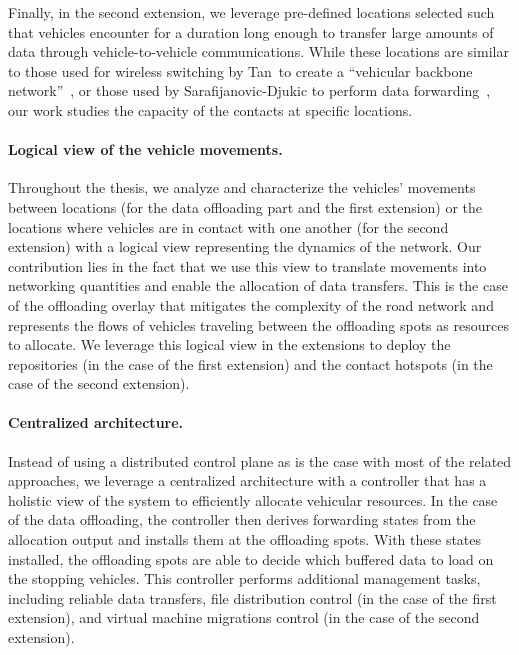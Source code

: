 Finally, in the second extension, we leverage pre-defined locations selected such that vehicles encounter for a duration long enough to transfer large amounts of data through vehicle-to-vehicle communications. While these locations are similar to those used for wireless switching by Tan~\etal to create a ``vehicular backbone network''~\cite{tan2014vehicular}, or those used by Sarafijanovic-Djukic \etal to perform data forwarding~\cite{sarafijanovic2006island}, our work studies the capacity of the contacts at specific locations.

\paragraph{Logical view of the vehicle movements.}
Throughout the thesis, we analyze and characterize the vehicles' movements between locations (for the data offloading part and the first extension) or the locations where vehicles are in contact with one another (for the second extension) with a logical view representing the dynamics of the network. Our contribution lies in the fact that we use this view to translate movements into networking quantities and enable the allocation of data transfers. This is the case of the offloading overlay that mitigates the complexity of the road network and represents the flows of vehicles traveling between the offloading spots as resources to allocate. We leverage this logical view in the extensions to deploy the repositories (in the case of the first extension) and the contact hotspots (in the case of the second extension).

\paragraph{Centralized architecture.}
Instead of using a distributed control plane as is the case with most of the related approaches, we leverage a centralized architecture with a controller that has a holistic view of the system to efficiently allocate vehicular resources. In the case of the data offloading, the controller then derives forwarding states from the allocation output and installs them at the offloading spots. With these states installed, the offloading spots are able to decide which buffered data to load on the stopping vehicles. This controller performs additional management tasks, including reliable data transfers, file distribution control (in the case of the first extension), and virtual machine migrations control (in the case of the second extension).